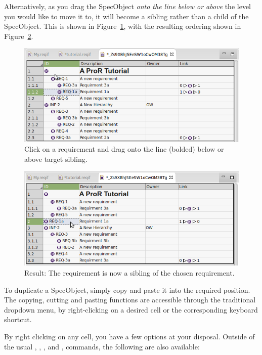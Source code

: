 Alternatively, as you drag the SpecObject \textit{onto the line below or above} the level you would like to move it to, it will become a sibling rather than a child of the SpecObject.  This is shown in Figure~\ref{fig:hierarchy_step_3}, with the resulting ordering shown in Figure~\ref{fig:hierarchy_step_4}.

\begin{figure}
  \centering
  \includegraphics[width=0.8\linewidth]{../rmf-images/hierarchy_step_3.png}
  \caption{Click on a requirement and drag onto the line (bolded) below or above target sibling.}
  \label{fig:hierarchy_step_3}
\end{figure}
\begin{figure}
  \centering
  \includegraphics[width=0.8\linewidth]{../rmf-images/hierarchy_step_4.png}
  \caption{Result: The requirement is now a sibling of the chosen requirement.}
  \label{fig:hierarchy_step_4}
\end{figure}

To duplicate a SpecObject, simply copy and paste it into the required position. The copying, cutting and pasting functions are accessible through the traditional dropdown menu, by right-clicking on a desired cell or the corresponding keyboard shortcut.

By right clicking on any cell, you have a few options at your disposal. Outside of the usual , , ,  and , commands, the following are also available:

